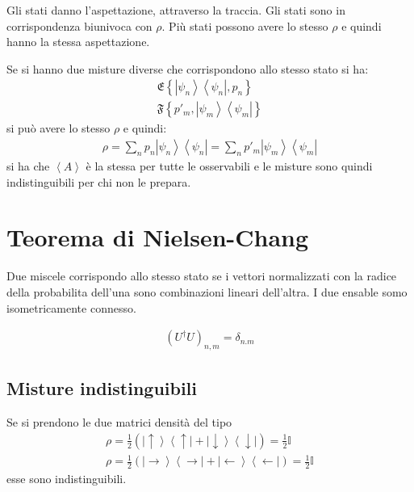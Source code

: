 
Gli stati danno l'aspettazione, attraverso la traccia. Gli stati sono in corrispondenza biunivoca con $\rho$. Più stati possono avere lo stesso $\rho$ e quindi hanno la stessa aspettazione.

Se si hanno due misture diverse che corrispondono allo stesso stato si ha:
\begin{equation}\begin{split}
\mathfrak{E}\left\{\left |\psi _n \right\rangle\left\langle \psi _n\right |,p_n\right\} \\
\mathfrak{F}\left\{p'_m,\left |\psi _m \right\rangle\left\langle \psi _m\right |\right\}
\end{split}\end{equation}
si può avere lo stesso $\rho$ e quindi:
\begin{equation}\begin{split}
\rho=\sum_n{p_n\left |\psi _n \right\rangle\left\langle \psi _n\right |}=\sum_n{p'_m\left |\psi _m \right\rangle\left\langle \psi _m\right |}
\end{split}\end{equation}
si ha che $\left\langle A \right\rangle$ è la stessa per tutte le osservabili e le misture sono quindi indistinguibili per chi non le prepara.

\section{Teorema di Nielsen-Chang} %
Due miscele corrispondo allo stesso stato se i vettori normalizzati con la radice della probabilita dell'una sono combinazioni lineari dell'altra. I due ensable somo isometricamente connesso.


\begin{equation}\begin{split}
\left(U^\dag U\right)_{n,m}=\delta_{n.m}
\end{split}\end{equation}

\subsection{Misture indistinguibili} %
Se si prendono le due matrici densità del tipo
\begin{equation}\begin{split}
\rho=\frac{1}{2}\left(\left |\uparrow \right\rangle\left\langle \uparrow\right |+\left |\downarrow \right\rangle\left\langle \downarrow\right |\right)=\frac{1}{2}\mathbb{I} \\
\rho=\frac{1}{2}\left(\left |\rightarrow \right\rangle\left\langle \rightarrow\right |+\left |\leftarrow \right\rangle\left\langle \leftarrow\right |\right)=\frac{1}{2}\mathbb{I}
\end{split}\end{equation}
esse sono indistinguibili.

